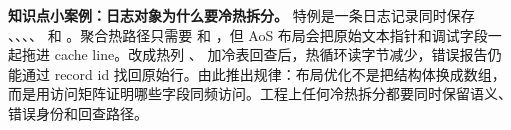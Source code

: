 \begin{casebox}
\textbf{知识点小案例：日志对象为什么要冷热拆分。}
特例是一条日志记录同时保存 、、、、 和 。聚合热路径只需要  和 ，但 AoS 布局会把原始文本指针和调试字段一起拖进 cache line。改成热列 、 加冷表回查后，热循环读字节减少，错误报告仍能通过 record id 找回原始行。由此推出规律：布局优化不是把结构体换成数组，而是用访问矩阵证明哪些字段同频访问。工程上任何冷热拆分都要同时保留语义、错误身份和回查路径。
\end{casebox}

